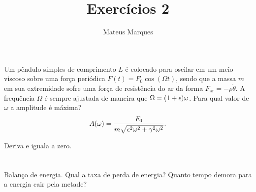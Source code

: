 \documentclass[a4paper,10pt]{article}
\title{\Huge{\textbf{Exercícios 2}}}
\author{Mateus Marques}
\begin{document}
\maketitle

\section{}

Um pêndulo simples de comprimento $L$ é colocado para oscilar em um meio viscoso sobre uma força periódica $F(t) = F_0 \cos(\Omega t)$, sendo que a massa $m$ em sua extremidade sofre uma força de resistência do ar da forma $F_{\text{ar}} = - \rho \dot{\theta}$. A frequência $\Omega$ é sempre ajustada de maneira que $\Omega = (1 + \epsilon) \omega$. Para qual valor de $\omega$ a amplitude é máxima?
$$
A(\omega) = \frac{F_0}{m \sqrt{\epsilon^2 \omega^2 + \gamma^2 \omega^2}}.
$$

Deriva e iguala a zero.


\section{}

Balanço de energia. Qual a taxa de perda de energia? Quanto tempo demora para a energia cair pela metade?
\end{document}
